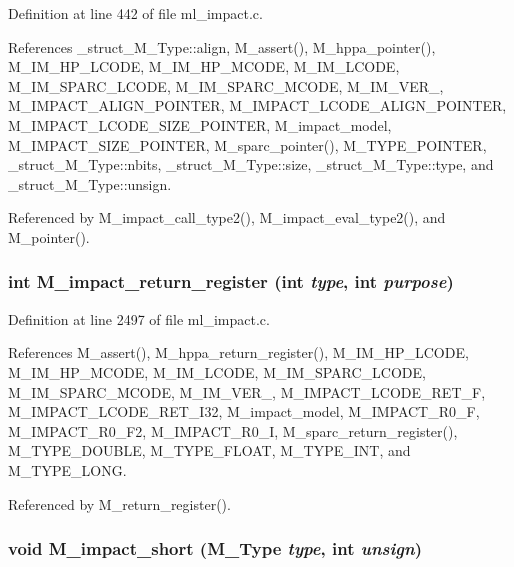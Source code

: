 Definition at line 442 of file ml\_\-impact.c.

References \_\-struct\_\-M\_\-Type::align, M\_\-assert(), M\_\-hppa\_\-pointer(), M\_\-IM\_\-HP\_\-LCODE, M\_\-IM\_\-HP\_\-MCODE, M\_\-IM\_\-LCODE, M\_\-IM\_\-SPARC\_\-LCODE, M\_\-IM\_\-SPARC\_\-MCODE, M\_\-IM\_\-VER\_, M\_\-IMPACT\_\-ALIGN\_\-POINTER, M\_\-IMPACT\_\-LCODE\_\-ALIGN\_\-POINTER, M\_\-IMPACT\_\-LCODE\_\-SIZE\_\-POINTER, M\_\-impact\_\-model, M\_\-IMPACT\_\-SIZE\_\-POINTER, M\_\-sparc\_\-pointer(), M\_\-TYPE\_\-POINTER, \_\-struct\_\-M\_\-Type::nbits, \_\-struct\_\-M\_\-Type::size, \_\-struct\_\-M\_\-Type::type, and \_\-struct\_\-M\_\-Type::unsign.

Referenced by M\_\-impact\_\-call\_\-type2(), M\_\-impact\_\-eval\_\-type2(), and M\_\-pointer().
\subsubsection{\setlength{\rightskip}{0pt plus 5cm}int M\_\-impact\_\-return\_\-register (int {\em type}, int {\em purpose})}\label{m__impact_8h_0556009b30b25e1e2083eb4d60ca0908}




Definition at line 2497 of file ml\_\-impact.c.

References M\_\-assert(), M\_\-hppa\_\-return\_\-register(), M\_\-IM\_\-HP\_\-LCODE, M\_\-IM\_\-HP\_\-MCODE, M\_\-IM\_\-LCODE, M\_\-IM\_\-SPARC\_\-LCODE, M\_\-IM\_\-SPARC\_\-MCODE, M\_\-IM\_\-VER\_, M\_\-IMPACT\_\-LCODE\_\-RET\_\-F, M\_\-IMPACT\_\-LCODE\_\-RET\_\-I32, M\_\-impact\_\-model, M\_\-IMPACT\_\-R0\_\-F, M\_\-IMPACT\_\-R0\_\-F2, M\_\-IMPACT\_\-R0\_\-I, M\_\-sparc\_\-return\_\-register(), M\_\-TYPE\_\-DOUBLE, M\_\-TYPE\_\-FLOAT, M\_\-TYPE\_\-INT, and M\_\-TYPE\_\-LONG.

Referenced by M\_\-return\_\-register().
\subsubsection{\setlength{\rightskip}{0pt plus 5cm}void M\_\-impact\_\-short (\bf{M\_\-Type} {\em type}, int {\em unsign})}\label{m__impact_8h_a94b5d5462bdc58c2bd5e481fb206674}




